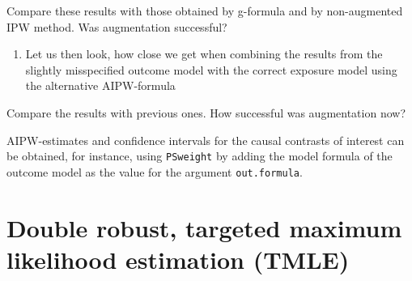 \documentclass[
]{book}
\newenvironment{Shaded}{\begin{snugshade}}{\end{snugshade}}
\newcommand{\DecValTok}[1]{\textcolor[rgb]{0.00,0.00,0.81}{#1}}
\newcommand{\FunctionTok}[1]{\textcolor[rgb]{0.13,0.29,0.53}{\textbf{#1}}}
\newcommand{\NormalTok}[1]{#1}
\newcommand{\OtherTok}[1]{\textcolor[rgb]{0.56,0.35,0.01}{#1}}
\newcommand{\SpecialCharTok}[1]{\textcolor[rgb]{0.81,0.36,0.00}{\textbf{#1}}}
\providecommand{\tightlist}{%
  \setlength{\itemsep}{0pt}\setlength{\parskip}{0pt}}
\begin{document}
Compare these results with those obtained by g-formula and by
non-augmented IPW method. Was augmentation successful?

\begin{enumerate}
\def\labelenumi{\arabic{enumi}.}
\setcounter{enumi}{1}
\tightlist
\item
  Let us then look, how close we get when combining the results
  from the slightly misspecified outcome model with the correct
  exposure model using the alternative AIPW-formula
\end{enumerate}

\begin{Shaded}
\end{Shaded}

Compare the results with previous ones.
How successful was augmentation now?

AIPW-estimates and confidence
intervals for the causal contrasts of interest can
be obtained, for instance, using \texttt{PSweight} by adding
the model formula of the outcome model
as the value for the argument \texttt{out.formula}.

\section{Double robust, targeted maximum likelihood estimation (TMLE)}\label{double-robust-targeted-maximum-likelihood-estimation-tmle}
\end{document}
